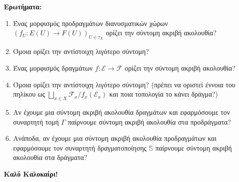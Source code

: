 $ $\newline
\textbf{Ερωτήματα:}
\begin{enumerate}
    \item Ένας μορφισμός προδραγμάτων διανυσματικών χώρων $(f_U:E(U)\longrightarrow F(U))_{U \in \tau_X}$ ορίζει την σύντομη ακριβή ακολουθία?
    \item Όμοια ορίζει την αντίστοιχη λιγότερο σύντομη?
    \item Ένας μορφισμός δραγμάτων $f:\mathcal{E}\longrightarrow \mathcal{F}$ ορίζει την σύντομη ακριβή ακολουθία?
    \item Όμοια ορίζει την αντίστοιχη λιγότερο σύντομη? (πρέπει να οριστεί έννοια του πηλίκου ως $\bigsqcup\limits_{x\in X} \mathcal{F}_x/f_x(\mathcal{E}_x)$ και ποια τοπολογία το κάνει δράγμα?)
    \item Αν έχουμε μια σύντομη ακριβή ακολουθία δραγμάτων και εφαρμόσουμε τον συναρτητή τομή $\Gamma$ παίρνουμε σύντομη ακριβή ακολουθία στα προδράγματα?
    \item Ανάποδα, αν έχουμε μια σύντομη ακριβή ακολουθία προδραγμάτων και εφαρμόσουμε τον συναρτητή δραγματοποίησης $\mathbb{S}$ παίρνουμε σύντομη ακριβή ακολουθία στα δράγματα?
\end{enumerate}

$ $\newline
\textbf{Καλό Καλοκαίρι!} 